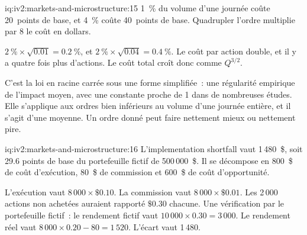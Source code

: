 \begin{solution}{iq:iv2:markets-and-microstructure:15}
1~\% du volume d'une journée coûte 20~points de base, et 4~\% coûte 40~points de base. Quadrupler l'ordre multiplie par 8 le coût en dollars.

$2~\% \times \sqrt{0.01} = 0.2~\%$, et $2~\% \times \sqrt{0.04} = 0.4~\%$. Le coût par action double, et il y a quatre fois plus d'actions. Le coût total croît donc comme $Q^{3/2}$.

C'est la loi en racine carrée sous une forme simplifiée~: une régularité empirique de l'impact moyen, avec une constante proche de 1 dans de nombreuses études. Elle s'applique aux ordres bien inférieurs au volume d'une journée entière, et il s'agit d'une moyenne. Un ordre donné peut faire nettement mieux ou nettement pire.

\end{solution}

\begin{solution}{iq:iv2:markets-and-microstructure:16}
L'implementation shortfall vaut 1\,480~\$, soit 29.6 points de base du portefeuille fictif de 500\,000~\$. Il se décompose en 800~\$ de coût d'exécution, 80~\$ de commission et 600~\$ de coût d'opportunité.

L'exécution vaut $8\,000 \times \$0.10$. La commission vaut $8\,000 \times \$0.01$. Les 2\,000 actions non achetées auraient rapporté $\$0.30$ chacune. Une vérification par le portefeuille fictif~: le rendement fictif vaut $10\,000 \times 0.30 = 3\,000$. Le rendement réel vaut $8\,000 \times 0.20 - 80 = 1\,520$. L'écart vaut 1\,480.

\end{solution}

